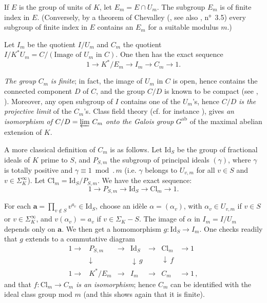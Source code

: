 If $E$ is the group of units of $K$, let $E_m = E \cap U_m$.  The
subgroup $E_m$ is of finite index in $E$.  (Conversely, by a theorem of
Chevalley (\cite{chevalley}, see also \cite{serre-congr}, n°~3.5) every
subgroup of finite index in $E$ contains an $E_m$ for a suitable modulus
$m$.)

Let $I_m$ be the quotient $I/U_m$ and $C_m$ the quotient
$I/K^*U_m = C/(\text{Image of } U_m \text{ in } C)$.  One then has the
exact sequence
\[
1 \longrightarrow K^*/E_m \longrightarrow I_m \longrightarrow C_m
\longrightarrow 1.
\]

\emph{The group} $C_m$ \emph{is finite}; in fact, the image of $U_m$ in
$C$ is open, hence contains the connected component $D$ of $C$, and the
group $C/D$ is known to be compact (see \cite{lang-abelian},
\cite{weil-bnt}).  Moreover, any open subgroup of $I$ contains one of the
$U_m$'s, hence $C/D$ \emph{is the projective limit} of the $C_m$'s.
Class field theory (cf.  for instance \cite{cassels-frohlich}), gives
\emph{an isomorphism of} $C/D = \varprojlim\, C_m$ \emph{onto the Galois
group} $G^{\mathrm{ab}}$ of the maximal abelian extension of $K$.


A more classical definition of $C_m$ is as follows.  Let
$\mathrm{Id}_S$ be the group of fractional ideals of $K$ prime to $S$,
and $P_{S,m}$ the subgroup of principal ideals $(\gamma)$, where
$\gamma$ is totally positive and $\gamma \equiv 1 \bmod.\, m$ (i.e.
$\gamma$ belongs to $U_{v,m}$ for all $v \in S$ and
$v \in \Sigma_K^\infty$).  Let $\mathrm{Cl}_m = \mathrm{Id}_S/P_{S,m}$.
We have the exact sequence:
\[
1 \longrightarrow P_{S,m} \longrightarrow \mathrm{Id}_S
\longrightarrow \mathrm{Cl}_m \longrightarrow 1.
\]

For each $\mathbf{a} = \prod\limits_{v \notin S} v^{a_v}
\in \mathrm{Id}_S$, choose an idèle $\alpha = (\alpha_v)$, with
$\alpha_v \in U_{v,m}$ if $v \in S$ or $v \in \Sigma_K^\infty$, and
$v(\alpha_v) = a_v$ if $v \in \Sigma_K - S$.  The image of $\alpha$ in
$I_m = I/U_m$ depends only on $\mathbf{a}$.  We then get a homomorphism
$g\colon \mathrm{Id}_S \to I_m$.  One checks readily that $g$ extends to
a commutative diagram
\[
\begin{array}{ccccccc}
1 \to & P_{S,m} & \to & \mathrm{Id}_S & \to & \mathrm{Cl}_m & \to 1\\
      & \downarrow & & \downarrow\, g & & \downarrow\, f & \\
1 \to & K^*/E_m & \to & I_m & \to & C_m & \to 1\,,
\end{array}
\]
and that $f\colon \mathrm{Cl}_m \to C_m$ \emph{is an isomorphism}; hence
$C_m$ can be identified with the ideal class group mod $m$ (and this
shows again that it is finite).

